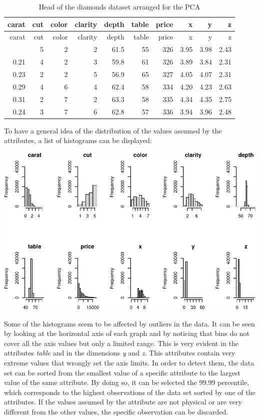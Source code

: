 \documentclass[
]{article}
\begin{document}
\begin{longtable}[]{@{}rrrrrrrrrr@{}}
\caption{Head of the diamonds dataset arranged for the
PCA}\tabularnewline
\toprule\noalign{}
carat & cut & color & clarity & depth & table & price & x & y & z \\
\midrule\noalign{}
\endfirsthead
\toprule\noalign{}
carat & cut & color & clarity & depth & table & price & x & y & z \\
\midrule\noalign{}
\endhead
\bottomrule\noalign{}
\endlastfoot
0.23 & 5 & 2 & 2 & 61.5 & 55 & 326 & 3.95 & 3.98 & 2.43 \\
0.21 & 4 & 2 & 3 & 59.8 & 61 & 326 & 3.89 & 3.84 & 2.31 \\
0.23 & 2 & 2 & 5 & 56.9 & 65 & 327 & 4.05 & 4.07 & 2.31 \\
0.29 & 4 & 6 & 4 & 62.4 & 58 & 334 & 4.20 & 4.23 & 2.63 \\
0.31 & 2 & 7 & 2 & 63.3 & 58 & 335 & 4.34 & 4.35 & 2.75 \\
0.24 & 3 & 7 & 6 & 62.8 & 57 & 336 & 3.94 & 3.96 & 2.48 \\
\end{longtable}

To have a general idea of the distribution of the values assumed by the
attributes, a list of histograms can be displayed:

\includegraphics{Report_files/figure-latex/unnamed-chunk-4-1.pdf}

Some of the histograms seem to be affected by outliers in the data. It
can be seen by looking at the horizontal axis of each graph and by
noticing that bins do not cover all the axis values but only a limited
range. This is very evident in the attributes \emph{table} and in the
dimensions \emph{y} and \emph{z}. This attributes contain very extreme
values that wrongly set the axis limits. In order to detect them, the
data set can be sorted from the smallest value of a specific attribute
to the largest value of the same attribute. By doing so, it can be
selected the 99.99 percentile, which corresponds to the highest
observations of the data set sorted by one of the attributes. If the
values assumed by the attribute are not physical or are very different
from the other values, the specific observation can be discarded.
\end{document}
